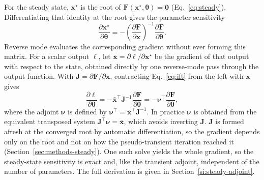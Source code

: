 \documentclass{article}
\begin{document}
For the steady state, \(\mathbf{x}^\star\) is the root of \(\mathbf{F}(\mathbf{x}^\star,\boldsymbol{\theta})=\mathbf{0}\) (Eq.~\eqref{eq:steady}). Differentiating that identity at the root gives the parameter sensitivity
\begin{equation}
  \frac{\partial\mathbf{x}^\star}{\partial\boldsymbol{\theta}}
  = -\left(\frac{\partial\mathbf{F}}{\partial\mathbf{x}}\right)^{-1}\frac{\partial\mathbf{F}}{\partial\boldsymbol{\theta}}.
  \label{eq:ift}
\end{equation}
Reverse mode evaluates the corresponding gradient without ever forming this matrix. For a scalar output \(\ell\), let \(\bar{\mathbf{x}}=\partial\ell/\partial\mathbf{x}^\star\) be the gradient of that output with respect to the state, obtained directly by one reverse-mode pass through the output function. With \(\mathbf{J}=\partial\mathbf{F}/\partial\mathbf{x}\), contracting Eq.~\eqref{eq:ift} from the left with \(\bar{\mathbf{x}}\) gives
\begin{equation}
  \frac{\partial\ell}{\partial\boldsymbol{\theta}}
  = -\bar{\mathbf{x}}^{\top}\mathbf{J}^{-1}\frac{\partial\mathbf{F}}{\partial\boldsymbol{\theta}}
  = -\boldsymbol{\nu}^{\top}\frac{\partial\mathbf{F}}{\partial\boldsymbol{\theta}},
  \label{eq:ift-adjoint}
\end{equation}
where the adjoint \(\boldsymbol{\nu}\) is defined by \(\boldsymbol{\nu}^{\top}=\bar{\mathbf{x}}^{\top}\mathbf{J}^{-1}\). In practice \(\boldsymbol{\nu}\) is obtained from the equivalent transposed system \(\mathbf{J}^{\top}\boldsymbol{\nu}=\bar{\mathbf{x}}\), which avoids inverting \(\mathbf{J}\). \(\mathbf{J}\) is formed afresh at the converged root by automatic differentiation, so the gradient depends only on the root and not on how the pseudo-transient iteration reached it (Section~\ref{sec:methods-steady}). One such solve yields the whole gradient, so the steady-state sensitivity is exact and, like the transient adjoint, independent of the number of parameters. The full derivation is given in Section~\ref{si:steady-adjoint}.
\end{document}
